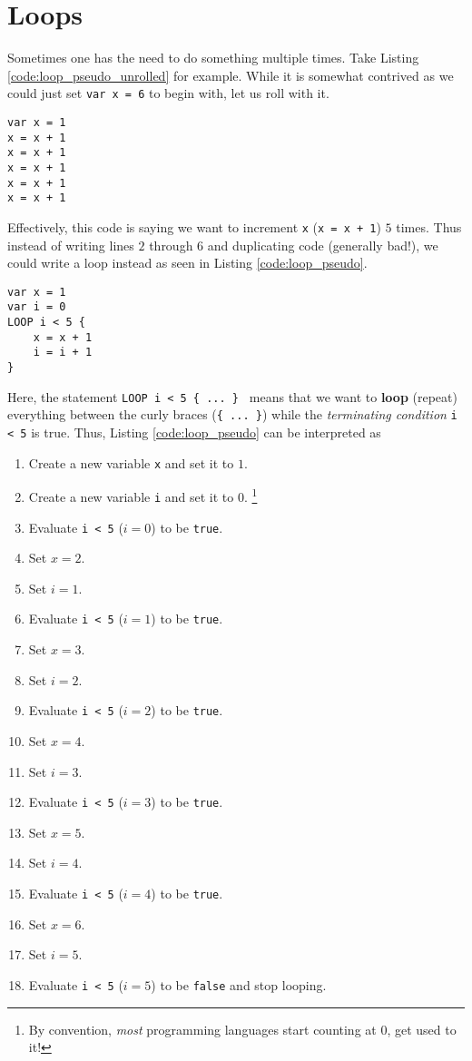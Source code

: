 \documentclass{article}
\begin{document}
\section{Loops}

Sometimes one has the need to do something multiple times.
Take Listing \ref{code:loop_pseudo_unrolled} for example.
While it is somewhat contrived as we could just set \lstinline{var x = 6} to begin with, let us roll with it.
\begin{lstlisting}[caption={Unless you know what are you doing (you don't), don't do this.}, label={code:loop_pseudo_unrolled}]
var x = 1
x = x + 1
x = x + 1
x = x + 1
x = x + 1
x = x + 1
\end{lstlisting}
Effectively, this code is saying we want to increment \lstinline{x} (\lstinline{x = x + 1}) $5$ times.
Thus instead of writing lines $2$ through $6$ and duplicating code (generally bad!), we could write a loop instead as seen in Listing \ref{code:loop_pseudo}.
\begin{lstlisting}[caption={Loops are cool.}, label={code:loop_pseudo}]
var x = 1
var i = 0
LOOP i < 5 {
    x = x + 1
    i = i + 1
}
\end{lstlisting}
Here, the statement \lstinline|LOOP i < 5 { ... } | means that we want to \textbf{loop} (repeat) everything between the curly braces (\lstinline|{ ... }|) while the \textit{terminating condition} \lstinline{i < 5} is true.
Thus, Listing \ref{code:loop_pseudo} can be interpreted as
\begin{enumerate}
\item Create a new variable \lstinline{x} and set it to $1$.
\item Create a new variable \lstinline{i} and set it to $0$. \footnote{By convention, \textit{most} programming languages start counting at $0$, get used to it!}
\item Evaluate \lstinline{i < 5} ($i = 0$) to be \lstinline{true}.
\item Set $x = 2$.
\item Set $i = 1$.
\item Evaluate \lstinline{i < 5} ($i = 1$) to be \lstinline{true}.
\item Set $x = 3$.
\item Set $i = 2$.
\item Evaluate \lstinline{i < 5} ($i = 2$) to be \lstinline{true}.
\item Set $x = 4$.
\item Set $i = 3$.
\item Evaluate \lstinline{i < 5} ($i = 3$) to be \lstinline{true}.
\item Set $x = 5$.
\item Set $i = 4$.
\item Evaluate \lstinline{i < 5} ($i = 4$) to be \lstinline{true}.
\item Set $x = 6$.
\item Set $i = 5$.
\item Evaluate \lstinline{i < 5} ($i = 5$) to be \lstinline{false} and stop looping.
\end{enumerate}
\end{document}

